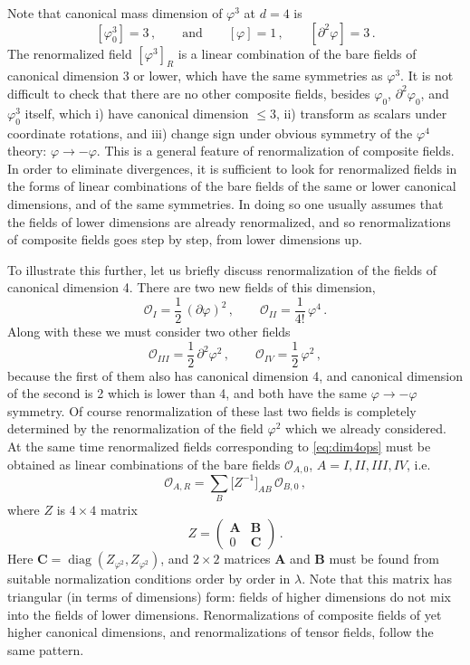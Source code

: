 Note that canonical mass dimension of $\varphi^3$ at $d=4$ is
\[
[\varphi_0^3]=3\,,\qquad\text{and}\qquad[\varphi]=1\,,\qquad[\partial^2\varphi]=3\,.
\]
The renormalized field $[\varphi^3]_R$ is a linear combination of the bare fields
of canonical dimension 3 or lower, which have the same symmetries as
$\varphi^3$. It is not difficult to check that there are no other composite
fields, besides $\varphi_0$, $\partial^2\varphi_0$, and $\varphi_0^3$ itself,
which i) have canonical dimension $\le3$, ii) transform as scalars under
coordinate rotations, and iii) change sign under obvious symmetry of the
$\varphi^4$ theory: $\varphi\to-\varphi$. This is a general feature of
renormalization of composite fields. In order to eliminate divergences, it is
sufficient to look for renormalized fields in the forms of linear combinations of
the bare fields of the same or lower canonical dimensions, and of the same
symmetries. In doing so one usually assumes that the fields of lower dimensions
are already renormalized, and so renormalizations of composite fields goes step
by step, from lower dimensions up.

To illustrate this further, let us briefly discuss renormalization of the fields
of canonical dimension 4. There are two new fields of this dimension,
\begin{equation}\label{eq:dim4ops}
\mathcal O_I=\frac12\,(\partial\varphi)^2\,,\qquad\mathcal O_{II}=\frac1{4!}\,\varphi^4\,.
\end{equation}
Along with these we must consider two other fields
\[
\mathcal O_{III}=\frac12\,\partial^2\varphi^2\,,\qquad\mathcal O_{IV}=\frac12\,\varphi^2\,,
\]
because the first of them also has canonical dimension 4, and canonical
dimension of the second is 2 which is lower than 4, and both have the same
$\varphi\to-\varphi$ symmetry. Of course renormalization of these last two fields
is completely determined by the renormalization of the field $\varphi^2$ which we
already considered. At the same time renormalized fields corresponding to
\eqref{eq:dim4ops} must be obtained as linear combinations of the bare fields
$\mathcal O_{A,0}$, $A=I,II,III,IV$, i.e.
\[
\mathcal O_{A,R}=\sum_B\bigl[Z^{-1}\bigr]_{AB}\,\mathcal O_{B,0}\,,
\]
where $Z$ is $4\times4$ matrix
\[
Z=\begin{pmatrix}\mathbf A&\mathbf B\\0&\mathbf C\end{pmatrix}\,.
\]
Here $\mathbf C=\operatorname{diag}(Z_{\varphi^2},Z_{\varphi^2})$, and $2\times2$
matrices $\mathbf A$ and $\mathbf B$ must be found from suitable normalization
conditions order by order in $\lambda$. Note that this matrix has triangular (in
terms of dimensions) form: fields of higher dimensions do not mix into the fields
of lower dimensions. Renormalizations of composite fields of yet higher canonical
dimensions, and renormalizations of tensor fields, follow the same pattern.
